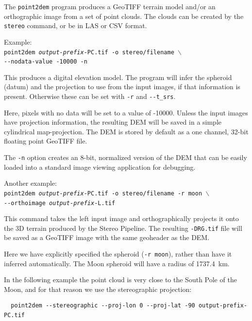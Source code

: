 The \texttt{point2dem} program produces a GeoTIFF terrain model and/or
an orthographic image from a set of point clouds. The clouds can be
created by the {\tt stereo} command, or be in LAS or CSV format.

Example:\\
\hspace*{2em}\texttt{point2dem \textit{output-prefix}-PC.tif -o stereo/filename $\backslash$} \\
\hspace*{4em}\texttt{-\/-nodata-value -10000 -n}

This produces a digital elevation model. The program will infer the
spheroid (datum) and the projection to use from the input images, if that
information is present. Otherwise these can be set with \texttt{-r} and \texttt{-\/-t\_srs}.

Here, pixels with no data will be set to a value of -10000. Unless the input
images have projection information, the resulting \ac{DEM} will be saved
in a simple cylindrical map-projection.  The \ac{DEM} is
stored by default as a one channel, 32-bit floating point GeoTIFF file.

The {\tt -n} option creates an 8-bit, normalized version of the DEM
that can be easily loaded into a standard image viewing application
for debugging.

Another example: \\
\hspace*{2em}\texttt{point2dem \textit{output-prefix}-PC.tif -o stereo/filename -r moon $\backslash$} \\
\hspace*{4em}\texttt{-\/-orthoimage \textit{output-prefix}-L.tif}

This command takes the left input image and orthographically projects
it onto the 3D terrain produced by the Stereo Pipeline.  The resulting
{\tt *-DRG.tif} file will be saved as a GeoTIFF image with the same
geoheader as the DEM.

Here we have explicitly specified the spheroid (\texttt{-r moon}), rather
than have it inferred automatically. The Moon spheroid will have
a radius of 1737.4~km.

In the following example the point cloud is very close to the
South Pole of the Moon, and for that reason we use the stereographic projection:
\begin{verbatim}
  point2dem --stereographic --proj-lon 0 --proj-lat -90 output-prefix-PC.tif
\end{verbatim}

